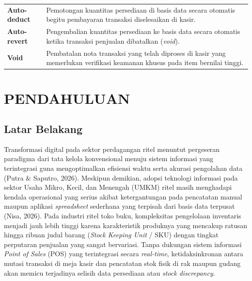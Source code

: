 \documentclass[11pt, a4paper]{article}
\begin{document}
\begin{tabularx}{\textwidth}{@{}p{3.2cm} X@{}}
\textbf{Auto-deduct} & Pemotongan kuantitas persediaan di basis data secara otomatis begitu pembayaran transaksi diselesaikan di kasir. \\ \addlinespace[0.3em]
\textbf{Auto-revert} & Pengembalian kuantitas persediaan ke basis data secara otomatis ketika transaksi penjualan dibatalkan (\textit{void}). \\ \addlinespace[0.3em]
\textbf{Void} & Pembatalan nota transaksi yang telah diproses di kasir yang memerlukan verifikasi keamanan khusus pada item bernilai tinggi. \\ \bottomrule
\end{tabularx}

\newpage
{}
\setcounter{page}{1}

\section{PENDAHULUAN}

\subsection{Latar Belakang}
Transformasi digital pada sektor perdagangan ritel menuntut pergeseran paradigma dari tata kelola konvensional menuju sistem informasi yang terintegrasi guna mengoptimalkan efisiensi waktu serta akurasi pengolahan data (Putra \& Saputro, 2026). Meskipun demikian, adopsi teknologi informasi pada sektor Usaha Mikro, Kecil, dan Menengah (UMKM) ritel masih menghadapi kendala operasional yang serius akibat ketergantungan pada pencatatan manual maupun aplikasi \textit{spreadsheet} sederhana yang terpisah dari basis data terpusat (Nisa, 2026). Pada industri ritel toko buku, kompleksitas pengelolaan inventaris menjadi jauh lebih tinggi karena karakteristik produknya yang mencakup ratusan hingga ribuan judul barang (\textit{Stock Keeping Unit} / SKU) dengan tingkat perputaran penjualan yang sangat bervariasi. Tanpa dukungan sistem informasi \textit{Point of Sales} (POS) yang terintegrasi secara \textit{real-time}, ketidaksinkronan antara mutasi transaksi di meja kasir dan pencatatan stok fisik di rak maupun gudang akan memicu terjadinya selisih data persediaan atau \textit{stock discrepancy}.
\end{document}
